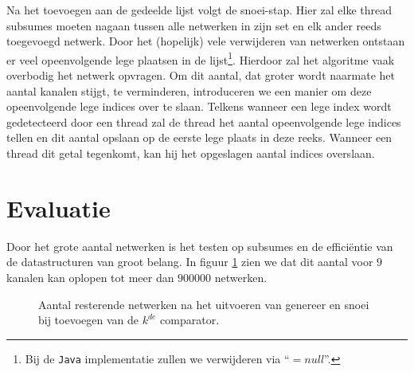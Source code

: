\documentclass{article}
\begin{document}
Na het toevoegen aan de gedeelde lijst volgt de snoei-stap. Hier zal elke thread subsumes moeten nagaan tussen alle netwerken in zijn set en elk ander reeds toegevoegd netwerk.
Door het (hopelijk) vele verwijderen van netwerken ontstaan er veel opeenvolgende lege plaatsen in de lijst\footnote{Bij de \texttt{Java} implementatie zullen we verwijderen via  ``${= null}$''.}.
Hierdoor zal het algoritme vaak overbodig het netwerk opvragen.
Om dit aantal, dat groter wordt naarmate het aantal kanalen stijgt, te verminderen, introduceren we een manier om deze opeenvolgende lege indices over te slaan. 
Telkens wanneer een lege index wordt gedetecteerd door een thread zal de thread het aantal opeenvolgende lege indices tellen en dit aantal opslaan op de eerste lege plaats in deze reeks.
Wanneer een thread dit getal tegenkomt, kan hij het opgeslagen aantal indices overslaan.

\section{Evaluatie}
Door het grote aantal netwerken is het testen op subsumes en de effici\"entie van de datastructuren van groot belang. In figuur \ref{netwerkVerloop9kanalen} zien we dat dit aantal voor $9$ kanalen kan oplopen tot meer dan $900000$ netwerken.
\begin{figure}[!h]
	\caption{Aantal resterende netwerken na het uitvoeren van genereer en snoei bij toevoegen van de $k^{de}$ comparator.}
	\label{netwerkVerloop9kanalen}
\end{figure}
\end{document}
